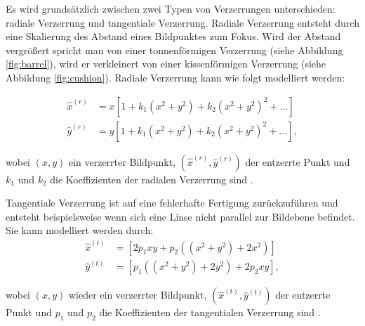 Es wird grundsätzlich zwischen zwei Typen von Verzerrungen unterschieden: radiale Verzerrung und tangentiale Verzerrung. 
Radiale Verzerrung entsteht durch eine Skalierung des Abstand eines Bildpunktes zum Fokus. Wird der Abstand vergrößert spricht man von einer tonnenförmigen Verzerrung (siehe Abbildung \ref{fig:barrel}), wird er verkleinert von einer kissenförmigen Verzerrung (siehe Abbildung \ref{fig:cushion}).
Radiale Verzerrung kann wie folgt modelliert werden:

\[
\begin{aligned}
\hat{x}^{(r)} &= x\left[1 + k_1\left(x^2 + y^2\right) + k_2\left(x^2 + y^2\right)^2 + \dotsc\right] \\
\hat{y}^{(r)} &= y\left[1 + k_1\left(x^2 + y^2\right) + k_2\left(x^2 + y^2\right)^2 + \dotsc\right],
\end{aligned}
\]

wobei $(x,y)$ ein verzerrter Bildpunkt, $(\hat{x}^{(r)}, \hat{y}^{(r)})$ der entzerrte Punkt und $k_1$ und $k_2$ die Koeffizienten der radialen Verzerrung sind \cite{Zhang2002}.

Tangentiale Verzerrung ist auf eine fehlerhafte Fertigung zurückzuführen und entsteht beispielsweise wenn sich eine Linse nicht parallel zur Bildebene befindet. 
Sie kann modelliert werden durch:
\[
\begin{aligned}
\hat{x}^{(t)} &= \left[2p_1xy + p_2\left((x^2 + y^2) + 2x^2\right)\right] \\
\hat{y}^{(t)} &= \left[p_1\left((x^2 + y^2) + 2y^2\right) + 2p_2xy\right],
\end{aligned}
\]

wobei $(x,y)$ wieder ein verzerrter Bildpunkt, $(\hat{x}^{(t)}, \hat{y}^{(t)})$ der entzerrte Punkt und $p_1$ und $p_2$ die Koeffizienten der tangentialen Verzerrung sind \cite{Heikkila1997}.

